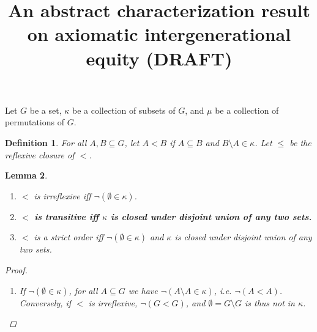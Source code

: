 \documentclass[11pt]{article}
\title{An abstract characterization result on axiomatic intergenerational equity (DRAFT)}
\newcommand{\nouveau}[1]{{\small \color{blue} \bf  #1}}
\newtheorem{definition}{Definition}
\newtheorem{lemma}[definition]{Lemma}
\begin{document}
\maketitle


Let $G$ be a set, $\kappa$ be a collection of subsets of $G$, and $\mu$ be a collection of permutations of $G$.


\begin{definition}
 For all $A,B \subseteq G$, let $A < B$ if $A \subseteq B$ and $B \setminus A \in \kappa$. Let $\leq$ be the reflexive closure of $<$.
\end{definition}



\begin{lemma}\label{lem:so}
\begin{enumerate}
 \item\label{lem:so1} $<$ is irreflexive iff $\neg(\emptyset \in \kappa)$.
 
 

 \item\label{lem:so23} \nouveau{%
     $<$ is transitive iff $\kappa$ is closed under disjoint union of any two sets.%
   }
 
 \item\label{lem:so4} $<$ is a strict order iff $\neg(\emptyset \in \kappa)$ and $\kappa$ is closed under disjoint union of any two sets.
\end{enumerate}

\begin{proof}
 \begin{enumerate}
  \item If $\neg(\emptyset \in \kappa)$, for all $A \subseteq G$ we have $\neg(A \setminus A \in \kappa)$, i.e. $\neg(A < A)$. Conversely, if $<$ is irreflexive, $\neg (G < G)$, and $\emptyset = G \setminus G$ is thus not in $\kappa$.
  
   
  

\end{enumerate}
\end{proof}
\end{lemma}
\end{document}
